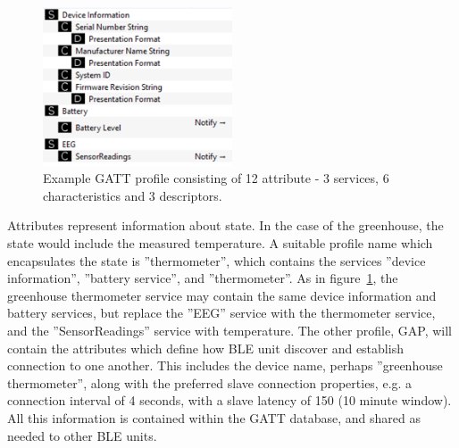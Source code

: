 \documentclass[]{article}
\begin{document}
\begin{figure}[htb]
	\begin{center}
		\includegraphics[width = 0.5\textwidth]{exampleprofile}
	\end{center}
	\caption{Example GATT profile consisting of 12 attribute - 3 services, 6 characteristics and 3 descriptors. }
	\label{fig:exampleprofile}
\end{figure}

 Attributes represent information about state. In the case of the greenhouse, the state would include the measured temperature. A suitable profile name which encapsulates the state is ''thermometer'', which contains the services ''device information'', ''battery service'', and ''thermometer''. As in figure~\ref{fig:exampleprofile}, the greenhouse thermometer service may contain the same device information and battery services, but replace the ''EEG'' service with the thermometer service, and the ''SensorReadings'' service with temperature. The other profile, \ac{GAP}, will contain the attributes which define how \ac{BLE} unit discover and establish connection to one another.  This includes the device name, perhaps ''greenhouse thermometer'', along with the preferred slave connection properties, e.g. a connection interval of 4 seconds, with a slave latency of 150 (10 minute window). All this information is contained within the GATT database, and shared as needed to other \ac{BLE} units. 
\end{document}
